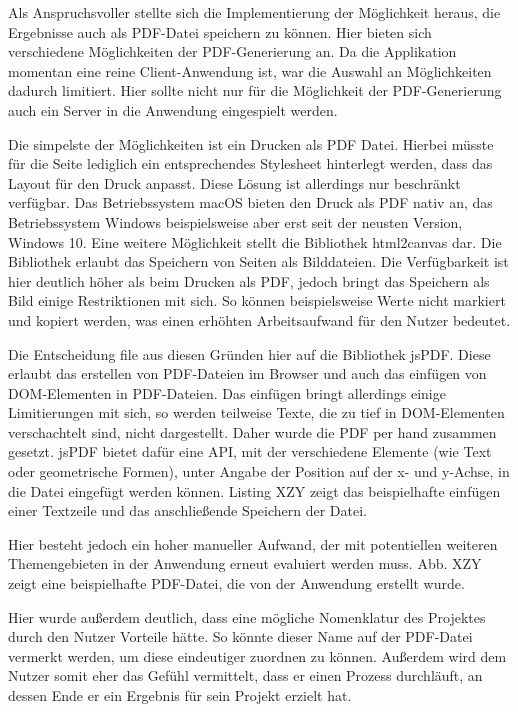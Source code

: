 Als Anspruchsvoller stellte sich die Implementierung der Möglichkeit heraus, die Ergebnisse auch als PDF-Datei speichern zu können. Hier bieten sich verschiedene Möglichkeiten der PDF-Generierung an. Da die Applikation momentan eine reine Client-Anwendung ist, war die Auswahl an Möglichkeiten dadurch limitiert. Hier sollte nicht nur für die Möglichkeit der PDF-Generierung auch ein Server in die Anwendung eingespielt werden.

Die simpelste der Möglichkeiten ist ein Drucken als PDF Datei. Hierbei müsste für die Seite lediglich ein entsprechendes Stylesheet hinterlegt werden, dass das Layout für den Druck anpasst. Diese Lösung ist allerdings nur beschränkt verfügbar. Das Betriebssystem macOS bieten den Druck als PDF nativ an, das Betriebssystem Windows beispielsweise aber erst seit der neusten Version, Windows 10.
Eine weitere Möglichkeit stellt die Bibliothek html2canvas\footnotemark{} dar. Die Bibliothek erlaubt das Speichern von Seiten als Bilddateien. Die Verfügbarkeit ist hier deutlich höher als beim Drucken als PDF, jedoch bringt das Speichern als Bild einige Restriktionen mit sich. So können beispielsweise Werte nicht markiert und kopiert werden, was einen erhöhten Arbeitsaufwand für den Nutzer bedeutet.


Die Entscheidung file aus diesen Gründen hier auf die Bibliothek jsPDF\footnotemark{}. Diese erlaubt das erstellen von PDF-Dateien im Browser und auch das einfügen von DOM-Elementen in PDF-Dateien. Das einfügen bringt allerdings einige Limitierungen mit sich, so werden teilweise Texte, die zu tief in DOM-Elementen verschachtelt sind, nicht dargestellt. Daher wurde die PDF per hand zusammen gesetzt. jsPDF bietet dafür eine API, mit der verschiedene Elemente (wie Text oder geometrische Formen), unter Angabe der Position auf der x- und y-Achse, in die Datei eingefügt werden können. Listing XZY zeigt das beispielhafte einfügen einer Textzeile und das anschließende Speichern der Datei.


Hier besteht jedoch ein hoher manueller Aufwand, der mit potentiellen weiteren Themengebieten in der Anwendung erneut evaluiert werden muss. Abb. XZY zeigt eine beispielhafte PDF-Datei, die von der Anwendung erstellt wurde.

Hier wurde außerdem deutlich, dass eine mögliche Nomenklatur des Projektes durch den Nutzer Vorteile hätte. So könnte dieser Name auf der PDF-Datei vermerkt werden, um diese eindeutiger zuordnen zu können. Außerdem wird dem Nutzer somit eher das Gefühl vermittelt, dass er einen Prozess durchläuft, an dessen Ende er ein Ergebnis für sein Projekt erzielt hat.
